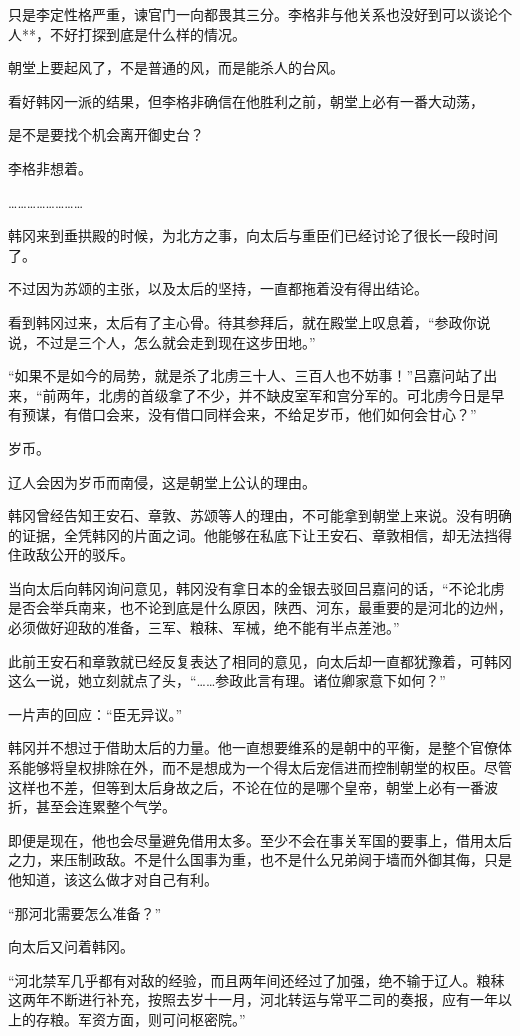 只是李定性格严重，谏官门一向都畏其三分。李格非与他关系也没好到可以谈论个人**，不好打探到底是什么样的情况。

朝堂上要起风了，不是普通的风，而是能杀人的台风。

看好韩冈一派的结果，但李格非确信在他胜利之前，朝堂上必有一番大动荡，

是不是要找个机会离开御史台？

李格非想着。

……………………

韩冈来到垂拱殿的时候，为北方之事，向太后与重臣们已经讨论了很长一段时间了。

不过因为苏颂的主张，以及太后的坚持，一直都拖着没有得出结论。

看到韩冈过来，太后有了主心骨。待其参拜后，就在殿堂上叹息着，“参政你说说，不过是三个人，怎么就会走到现在这步田地。”

“如果不是如今的局势，就是杀了北虏三十人、三百人也不妨事！”吕嘉问站了出来，“前两年，北虏的首级拿了不少，并不缺皮室军和宫分军的。可北虏今日是早有预谋，有借口会来，没有借口同样会来，不给足岁币，他们如何会甘心？”

岁币。

辽人会因为岁币而南侵，这是朝堂上公认的理由。

韩冈曾经告知王安石、章敦、苏颂等人的理由，不可能拿到朝堂上来说。没有明确的证据，全凭韩冈的片面之词。他能够在私底下让王安石、章敦相信，却无法挡得住政敌公开的驳斥。

当向太后向韩冈询问意见，韩冈没有拿日本的金银去驳回吕嘉问的话，“不论北虏是否会举兵南来，也不论到底是什么原因，陕西、河东，最重要的是河北的边州，必须做好迎敌的准备，三军、粮秣、军械，绝不能有半点差池。”

此前王安石和章敦就已经反复表达了相同的意见，向太后却一直都犹豫着，可韩冈这么一说，她立刻就点了头，“……参政此言有理。诸位卿家意下如何？”

一片声的回应：“臣无异议。”

韩冈并不想过于借助太后的力量。他一直想要维系的是朝中的平衡，是整个官僚体系能够将皇权排除在外，而不是想成为一个得太后宠信进而控制朝堂的权臣。尽管这样也不差，但等到太后身故之后，不论在位的是哪个皇帝，朝堂上必有一番波折，甚至会连累整个气学。

即便是现在，他也会尽量避免借用太多。至少不会在事关军国的要事上，借用太后之力，来压制政敌。不是什么国事为重，也不是什么兄弟阋于墙而外御其侮，只是他知道，该这么做才对自己有利。

“那河北需要怎么准备？”

向太后又问着韩冈。

“河北禁军几乎都有对敌的经验，而且两年间还经过了加强，绝不输于辽人。粮秣这两年不断进行补充，按照去岁十一月，河北转运与常平二司的奏报，应有一年以上的存粮。军资方面，则可问枢密院。”


